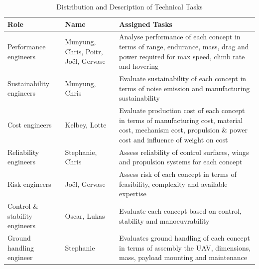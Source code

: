 \begin{table}[H]
    \centering
    \caption{Distribution and Description of Technical Tasks}
    \label{tab:ttdiv}
        \begin{tabular}{>{\raggedright\arraybackslash}p{3.5cm}>{\raggedright\arraybackslash}p{3.5cm}>{\raggedright\arraybackslash}p{7cm}}
        \toprule 
        \textbf{Role} & \textbf{Name} & \textbf{Assigned Tasks} \\ \toprule
        Performance engineers & Munyung, Chris, Poitr, Joël, Gervase & Analyse performance of each concept in terms of range, endurance, mass, drag and power required for max speed, climb rate and hovering \\
        \hdashline
        Sustainability engineers & Munyung, Chris & Evaluate sustainability of each concept in terms of noise emission and manufacturing sustainability\\
        \hdashline
        Cost engineers & Kelbey, Lotte & Evaluate production cost of each concept in terms of manufacturing cost, material cost, mechanism cost, propulsion \& power cost and influence of weight on cost\\ 
        \hdashline
        Reliability engineers & Stephanie, Chris & Assess reliability of control surfaces, wings and propulsion systems for each concept\\ 
        \hdashline
        Risk engineers & Joël, Gervase & Assess risk of each concept in terms of feasibility, complexity and available expertise\\ 
        \hdashline
        Control \& stability engineers & Oscar, Lukas & Evaluate each concept based on control, stability and manoeuvrability\\ 
        \hdashline
        Ground handling engineer & Stephanie & Evaluates ground handling of each concept in terms of assembly the UAV, dimensions, mass, payload mounting and maintenance \\
        \bottomrule
    \end{tabular}
\end{table}

